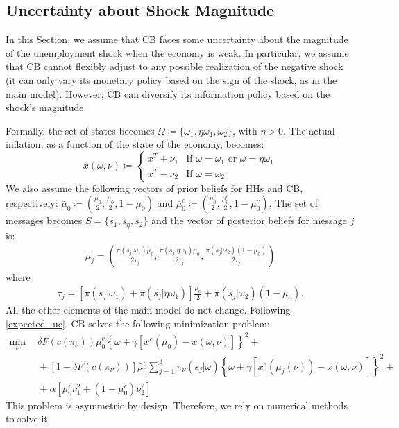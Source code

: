 \documentclass[12pt,a4paper]{article}
\begin{document}
\subsection{Uncertainty about Shock Magnitude}

In this Section, we assume that CB faces some uncertainty about the magnitude of the unemployment shock when the economy is weak. In particular, we assume that CB cannot flexibly adjust to any possible realization of the negative shock (it can only vary its monetary policy based on the sign of the shock, as in the main model). However, CB can diversify its information policy based on the shock's magnitude.

Formally, the set of states becomes $\Omega \coloneqq \{\omega_1, \eta\omega_1,\omega_2\}$, with $\eta>0$.
The actual inflation, as a function of the state of the economy, becomes: 
\begin{equation}
    x(\omega,\nu)\coloneqq\left\{
    \begin{array}{cc}
      x^T+\nu_1&  \mbox{If } \omega=\omega_1 \mbox{ or } \omega=\eta\omega_1\\
      x^T-\nu_2   &  \mbox{If } \omega=\omega_2
    \end{array}
    \right.
\end{equation}
We also assume the following vectors of prior beliefs for HHs and CB, respectively: $\bar{\mu}_0\coloneqq\left(\frac{\mu_0}{2},\frac{\mu_0}{2},1-\mu_0\right)$ and $\bar{\mu}_0^c\coloneqq\left(\frac{\mu_0^c}{2},\frac{\mu_0^c}{2},1-\mu_0^c\right)$. The set of messages becomes $S=\{s_1,s_\eta,s_2\}$ and the vector of posterior beliefs for message $j$ is:
\begin{align}
    \mu_j = \left(\frac{\pi(s_j|\omega_1)\mu_0}{2\tau_j}, \frac{\pi(s_j|\eta\omega_1)\mu_0}{2\tau_j}, \frac{\pi(s_j|\omega_2)(1-\mu_0)}{2\tau_j}\right)
\end{align}
where
\begin{align}
    \tau_j = [\pi(s_j|\omega_1)+\pi(s_j|\eta\omega_1)]\frac{\mu_0}{2} + \pi(s_j|\omega_2)(1-\mu_0).
\end{align}
All the other elements of the main model do not change. Following \eqref{expected_uc}, CB solves the following minimization problem:
\begin{equation}
    \begin{split}
    \min_{\nu} \ & \ \delta F(c(\pi_\nu))\bar{\mu}_0^c\left\{\omega+\gamma\left[x^e(\bar{\mu}_0)-x(\omega,\nu)\right]\right\}^2+\\
    \ & \ +[1-\delta F(c(\pi_\nu))]\bar{\mu}_0^c\sum_{j=1}^{3}\pi_\nu(s_j|\omega)\left\{\omega+\gamma\left[x^e(\mu_j(\nu))-x(\omega,\nu)\right]\right\}^2+\\
    \ & \ +\alpha [\mu_0^c\nu_1^2+(1-\mu_0^c)\nu_2^2]
    \end{split}
\end{equation}
This problem is asymmetric by design. Therefore, we rely on numerical methods to solve it.
\end{document}
